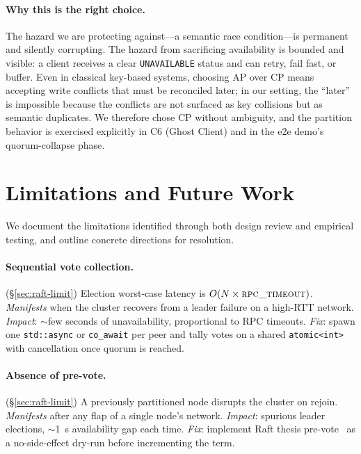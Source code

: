 \documentclass[sigconf]{acmart}
\begin{document}
\paragraph{\textbf{Why this is the right choice.}}
The hazard we are protecting against---a semantic race condition---is
permanent and silently corrupting. The hazard from sacrificing
availability is bounded and visible: a client receives a clear
\texttt{UNAVAILABLE} status and can retry, fail fast, or buffer. Even
in classical key-based systems, choosing AP over CP means accepting
write conflicts that must be reconciled later; in our setting, the
``later'' is impossible because the conflicts are not surfaced as
key collisions but as semantic duplicates. We therefore chose CP
without ambiguity, and the partition behavior is exercised explicitly
in C6 (Ghost Client) and in the e2e demo's quorum-collapse phase.

\section{Limitations and Future Work}
\label{sec:limitations}

We document the limitations identified through both design review and
empirical testing, and outline concrete directions for resolution.

\paragraph{Sequential vote collection.} (\S\ref{sec:raft-limit})
Election worst-case latency is $O(N\times\textsc{rpc\_timeout})$.
\emph{Manifests} when the cluster recovers from a leader failure on a
high-RTT network. \emph{Impact}: $\sim$few seconds of unavailability,
proportional to RPC timeouts. \emph{Fix}: spawn one \texttt{std::async}
or \texttt{co\_await} per peer and tally votes on a shared
\texttt{atomic<int>} with cancellation once quorum is reached.

\paragraph{Absence of pre-vote.} (\S\ref{sec:raft-limit})
A previously partitioned node disrupts the cluster on rejoin.
\emph{Manifests} after any flap of a single node's network. \emph{Impact}:
spurious leader elections, $\sim$1~s availability gap each time.
\emph{Fix}: implement Raft thesis pre-vote~\cite{raft-thesis} as a
no-side-effect dry-run before incrementing the term.
\end{document}
